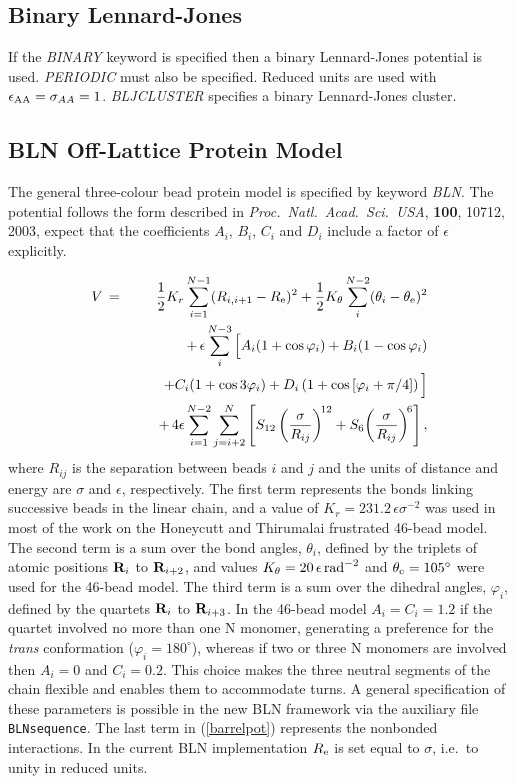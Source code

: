 \documentclass[12pt,a4paper,dvips]{article}
\begin{document}
\subsection{Binary Lennard-Jones}

If the {\it BINARY\/} keyword is specified then a binary Lennard-Jones
potential is used\cite{sastryds98}. {\it PERIODIC\/} must also be
specified. Reduced units are used with $\epsilon_{\rm AA}=\sigma_{AA}=1$.
{\it BLJCLUSTER\/} specifies a binary Lennard-Jones cluster.

\subsection{BLN Off-Lattice Protein Model}
\label{sec:BLN}

The general three-colour bead protein model is specified by keyword {\it BLN}.
The potential follows the form described in
{\it Proc.~Natl.~Acad.~Sci.~USA}, {\bf 100}, 10712, 2003, expect that
the coefficients $A_i$, $B_i$, $C_i$ and $D_i$ include a factor of $\epsilon$
explicitly.

{\begin{eqnarray}
V&\,=\,&\frac{1}{2} K_r\sum_{i=1}^{N-1}(R_{i,i+1}-R_{\rm e})^2
 +\frac{1}{2} K_\theta\sum_i^{N-2}(\theta_i-\theta_{\rm e})^2 \nonumber\\
 &&+\,\epsilon\sum_i^{N-3}\Big[A_i(1+\cos\varphi_i)+B_i(1-\cos\varphi_i) \nonumber\\
  && \qquad +C_i(1+\cos3\varphi_i)+D_i\left(1+\cos\left[\varphi_i+\pi/4\right]\right)\Big] \nonumber\\
 &&+\,4\epsilon\sum_{i=1}^{N-2}\sum_{j=i+2}^N \left[S_{12}\left(\frac{\sigma}{R_{ij}}\right)^{\!12}
    +S_6\!\left(\frac{\sigma}{R_{ij}}\right)^{\!6}\right],
\label{barrelpot}
\end{eqnarray}}
\noindent where $R_{ij}$ is the separation between beads $i$ and $j$ and
the units of distance and energy are $\sigma$ and $\epsilon$, respectively.
The first term represents the bonds linking successive beads in the linear chain, and a 
value of $K_r=231.2\,\epsilon\sigma^{-2}$ was used in most of the work on the 
Honeycutt and Thirumalai frustrated 46-bead model.
The second term is a sum over the bond angles, $\theta_i$, defined by the triplets
of atomic positions ${\bf R}_i$ to ${\bf R}_{i+2}$, and values
$K_\theta=20\,\epsilon\,{\rm rad}^{-2}$ and $\theta_{\rm e}=105^\circ$ were
used for the 46-bead model.
The third term
is a sum over the dihedral angles, $\varphi_i$, defined by the quartets ${\bf R}_i$ to
${\bf R}_{i+3}$. 
In the 46-bead model $A_i=C_i=1.2$ if the quartet involved no more than one N monomer, generating
a preference for the {\it trans\/} conformation ($\varphi_i=180^\circ$), whereas if two or three
N monomers are involved then $A_i=0$ and $C_i=0.2$.
This choice makes the three neutral
segments of the chain flexible and enables them to accommodate turns.
A general specification of these parameters is possible in the new BLN framework
via the auxiliary file {\tt BLNsequence}.
The last term in (\ref{barrelpot}) represents the nonbonded interactions.
In the current BLN implementation $R_{\rm e}$ is set equal to $\sigma$, i.e.~to 
unity in reduced units.
\end{document}

